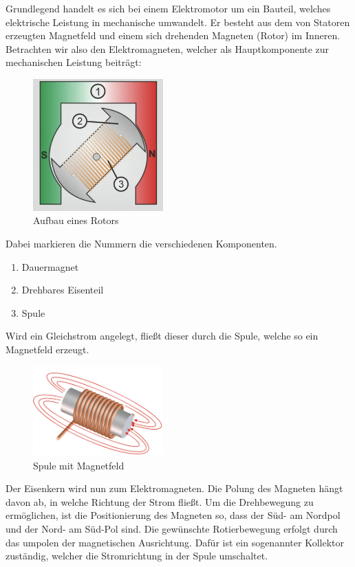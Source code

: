 Grundlegend handelt es sich bei einem Elektromotor um ein Bauteil, welches elektrische Leistung in mechanische umwandelt.
Er besteht aus dem von Statoren erzeugten Magnetfeld und einem sich drehenden Magneten (Rotor) im Inneren.
Betrachten wir also den Elektromagneten, welcher als Hauptkomponente zur mechanischen Leistung beiträgt:

\begin{figure}[htbp]
	\centering
	\includegraphics[width=5cm]{img/AufbauElektromagnet}
	\caption{Aufbau eines Rotors\cite*[siehe ][]{Aufbau.Elektromotoren}}
	\label{fig:Elektromagnet}
\end{figure}
Dabei markieren die Nummern die verschiedenen Komponenten.
\begin{enumerate}
	\item Dauermagnet %
	\item Drehbares Eisenteil
	\item Spule
\end{enumerate}
Wird ein Gleichstrom angelegt, fließt dieser durch die Spule, welche so ein Magnetfeld erzeugt.
\begin{figure}[htbp]
	\centering
	\includegraphics[width=5cm]{img/Magnetfeld}
	\caption{Spule mit Magnetfeld\cite*[siehe ][]{Elektromagnete}}
	\label{fig:Magnetfeld}
\end{figure}
Der Eisenkern wird nun zum Elektromagneten. Die Polung des Magneten hängt davon ab, in welche Richtung der Strom fließt.
Um die Drehbewegung zu ermöglichen, ist die Positionierung des Magneten so, dass der Süd- am Nordpol und der Nord- am Süd-Pol
sind. Die gewünschte Rotierbewegung erfolgt durch das umpolen der magnetischen Ausrichtung.
Dafür ist ein sogenannter Kollektor zuständig, welcher die Stromrichtung in der Spule umschaltet.



